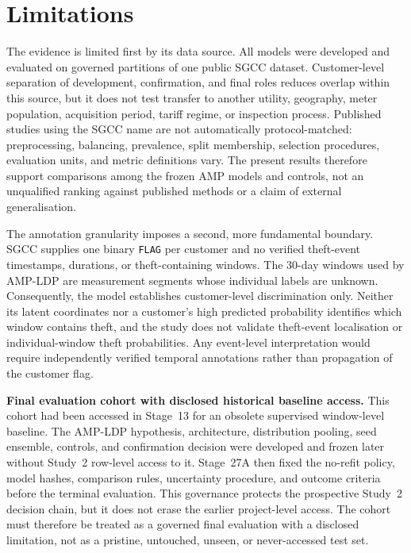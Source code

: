 \section{Limitations}\label{sec:limitations}

The evidence is limited first by its data source. All models were developed and evaluated on governed partitions of one public SGCC dataset. Customer-level separation of development, confirmation, and final roles reduces overlap within this source, but it does not test transfer to another utility, geography, meter population, acquisition period, tariff regime, or inspection process. Published studies using the SGCC name are not automatically protocol-matched: preprocessing, balancing, prevalence, split membership, selection procedures, evaluation units, and metric definitions vary. The present results therefore support comparisons among the frozen AMP models and controls, not an unqualified ranking against published methods or a claim of external generalisation.

The annotation granularity imposes a second, more fundamental boundary. SGCC supplies one binary \texttt{FLAG} per customer and no verified theft-event timestamps, durations, or theft-containing windows. The 30-day windows used by AMP-LDP are measurement segments whose individual labels are unknown. Consequently, the model establishes customer-level discrimination only. Neither its latent coordinates nor a customer's high predicted probability identifies which window contains theft, and the study does not validate theft-event localisation or individual-window theft probabilities. Any event-level interpretation would require independently verified temporal annotations rather than propagation of the customer flag.

\textbf{Final evaluation cohort with disclosed historical baseline access.} This cohort had been accessed in Stage~13 for an obsolete supervised window-level baseline. The AMP-LDP hypothesis, architecture, distribution pooling, seed ensemble, controls, and confirmation decision were developed and frozen later without Study~2 row-level access to it. Stage~27A then fixed the no-refit policy, model hashes, comparison rules, uncertainty procedure, and outcome criteria before the terminal evaluation. This governance protects the prospective Study~2 decision chain, but it does not erase the earlier project-level access. The cohort must therefore be treated as a governed final evaluation with a disclosed limitation, not as a pristine, untouched, unseen, or never-accessed test set.

